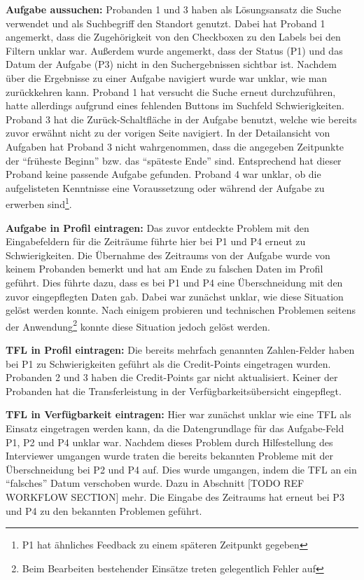 \documentclass[
  12pt,
  ngerman,
  a4paper,
]{article}
\begin{document}
\textbf{Aufgabe aussuchen:} Probanden 1 und 3 haben als Lösungsansatz
die Suche verwendet und als Suchbegriff den Standort genutzt. Dabei hat
Proband 1 angemerkt, dass die Zugehörigkeit von den Checkboxen zu den
Labels bei den Filtern unklar war. Außerdem wurde angemerkt, dass der
Status (P1) und das Datum der Aufgabe (P3) nicht in den Suchergebnissen
sichtbar ist. Nachdem über die Ergebnisse zu einer Aufgabe navigiert
wurde war unklar, wie man zurückkehren kann. Proband 1 hat versucht die
Suche erneut durchzuführen, hatte allerdings aufgrund eines fehlenden
Buttons im Suchfeld Schwierigkeiten. Proband 3 hat die
Zurück-Schaltfläche in der Aufgabe benutzt, welche wie bereits zuvor
erwähnt nicht zu der vorigen Seite navigiert. In der Detailansicht von
Aufgaben hat Proband 3 nicht wahrgenommen, dass die angegeben Zeitpunkte
der ``früheste Beginn'' bzw. das ``späteste Ende'' sind. Entsprechend
hat dieser Proband keine passende Aufgabe gefunden. Proband 4 war
unklar, ob die aufgelisteten Kenntnisse eine Voraussetzung oder während
der Aufgabe zu erwerben sind\footnote{P1 hat ähnliches Feedback zu einem
  späteren Zeitpunkt gegeben}.

\textbf{Aufgabe in Profil eintragen:} Das zuvor entdeckte Problem mit
den Eingabefeldern für die Zeiträume führte hier bei P1 und P4 erneut zu
Schwierigkeiten. Die Übernahme des Zeitraums von der Aufgabe wurde von
keinem Probanden bemerkt und hat am Ende zu falschen Daten im Profil
geführt. Dies führte dazu, dass es bei P1 und P4 eine Überschneidung mit
den zuvor eingepflegten Daten gab. Dabei war zunächst unklar, wie diese
Situation gelöst werden konnte. Nach einigem probieren und technischen
Problemen seitens der Anwendung\footnote{Beim Bearbeiten bestehender
  Einsätze treten gelegentlich Fehler auf} konnte diese Situation jedoch
gelöst werden.

\textbf{TFL in Profil eintragen:} Die bereits mehrfach genannten
Zahlen-Felder haben bei P1 zu Schwierigkeiten geführt als die
Credit-Points eingetragen wurden. Probanden 2 und 3 haben die
Credit-Points gar nicht aktualisiert. Keiner der Probanden hat die
Transferleistung in der Verfügbarkeitsübersicht eingepflegt.

\textbf{TFL in Verfügbarkeit eintragen:} Hier war zunächst unklar wie
eine TFL als Einsatz eingetragen werden kann, da die Datengrundlage für
das Aufgabe-Feld P1, P2 und P4 unklar war. Nachdem dieses Problem durch
Hilfestellung des Interviewer umgangen wurde traten die bereits
bekannten Probleme mit der Überschneidung bei P2 und P4 auf. Dies wurde
umgangen, indem die TFL an ein ``falsches'' Datum verschoben wurde. Dazu
in Abschnitt {[}TODO REF WORKFLOW SECTION{]} mehr. Die Eingabe des
Zeitraums hat erneut bei P3 und P4 zu den bekannten Problemen geführt.
\end{document}
